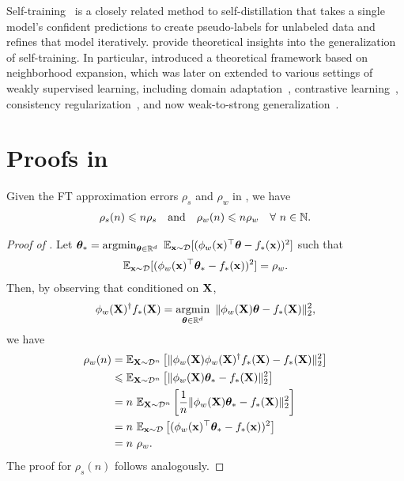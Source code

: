 Self-training~\citep{scudder1965probability,lee2013pseudo} is a closely related method to self-distillation that takes a single model's confident predictions to create pseudo-labels for unlabeled data and refines that model iteratively. 
\citet{wei2020theoretical,oymak2021theoretical,frei2022self} provide theoretical insights into the generalization of self-training. 
In particular, \citet{wei2020theoretical} introduced a theoretical framework based on neighborhood expansion, which was later on extended to various settings of weakly supervised learning, including domain adaptation~\citep{cai2021theory}, contrastive learning~\citep{shen2022connect}, consistency regularization~\citep{yang2023sample}, and now weak-to-strong generalization~\citep{lang2024theoretical,shin2024weak}.




\section{Proofs in }

\begin{lemma}\label{lem:low_est_err_ft}    
    Given the FT approximation errors $\rho_s$ and $\rho_w$ in , we have
    \begin{align*}
        \rho_s(n) \leqslant n \rho_s \quad \text{and} \quad \rho_w(n) \leqslant n \rho_w \quad \forall\ n \in \mathbb{N}.
    \end{align*}
\end{lemma}

\begin{proof}[Proof of ]
    Let $\boldsymbol{\theta}_* = \mathop{\mathrm{argmin}}_{\boldsymbol{\theta} \in \mathbb{R}^d}\ \mathbb{E}_{\mathbf{x} \sim \mathcal{D}}[(\phi_w(\mathbf{x})^\top \boldsymbol{\theta} - f_*(\mathbf{x}))^2]$ such that
    \begin{align*}
        \mathbb{E}_{\mathbf{x} \sim \mathcal{D}}[(\phi_w(\mathbf{x})^\top \boldsymbol{\theta}_* - f_*(\mathbf{x}))^2] = \rho_w.
    \end{align*}
    Then, by observing that conditioned on $\mathbf{X}$,
    \begin{align*}
        \phi_w(\mathbf{X})^\dagger f_*(\mathbf{X}) = \mathop{\mathrm{argmin}}_{\boldsymbol{\theta} \in \mathbb{R}^d}\ \| \phi_w(\mathbf{X}) \boldsymbol{\theta} - f_*(\mathbf{X}) \|_2^2,
    \end{align*} 
    we have
    \begin{align*}
        \rho_w(n) &= \mathbb{E}_{\mathbf{X} \sim \mathcal{D}^n}\left[\| \phi_w(\mathbf{X}) \phi_w(\mathbf{X})^\dagger f_*(\mathbf{X}) - f_*(\mathbf{X}) \|_2^2\right] \\
        &\leqslant \mathbb{E}_{\mathbf{X} \sim \mathcal{D}^n}\left[\| \phi_w(\mathbf{X}) \boldsymbol{\theta}_* - f_*(\mathbf{X}) \|_2^2\right] \\
        &= n\ \mathbb{E}_{\mathbf{X} \sim \mathcal{D}^n}\left[\frac{1}{n} \| \phi_w(\mathbf{X}) \boldsymbol{\theta}_* - f_*(\mathbf{X}) \|_2^2\right] \\
        &= n\ \mathbb{E}_{\mathbf{x} \sim \mathcal{D}}\left[(\phi_w(\mathbf{x})^\top \boldsymbol{\theta}_* - f_*(\mathbf{x}))^2\right] \\
        &= n\ \rho_w.
    \end{align*}
    The proof for $\rho_s(n)$ follows analogously.
\end{proof}



